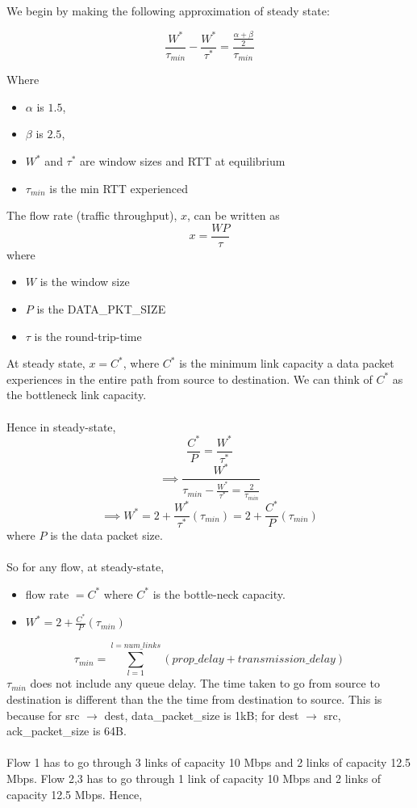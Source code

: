 \documentclass[12pt]{article}
\begin{document}
We begin by making the following approximation of steady state:

$$ \frac{W^*}{\tau_{min}} - \frac{W^*}{\tau^*} = \frac{\frac{\alpha + \beta}{2}}{\tau_{min}} $$

Where 
\begin{itemize}
\item $\alpha$ is $1.5$,
\item $\beta$ is $2.5$,
\item $W^*$ and $\tau^*$ are window sizes and RTT at equilibrium
\item $\tau_{min}$ is the min RTT experienced
\end{itemize}

The flow rate (traffic throughput), $x$, can be written as $$x=\frac{WP}{\tau}$$ where
\begin{itemize}
\item $W$ is the window size
\item $P$ is the DATA\_PKT\_SIZE
\item $\tau$ is the round-trip-time
\end{itemize}

At steady state, $x=C^*$, where $C^*$ is the minimum link capacity a data packet experiences in the entire path from source to destination. We can think of $C^*$ as the bottleneck link capacity.
\\\\
Hence in steady-state, $$\frac{C^*}{P} = \frac{W^*}{\tau^*} $$
$$\implies \frac{W^*}{\tau_{min} - \frac{W^*}{\tau^*} = \frac{2}{\tau_{min}}}$$
$$\implies W^* = 2 + \frac{W^*}{\tau^*}(\tau_{min}) = 2 + \frac{C^*}{P}(\tau_{min}) $$
where $P$ is the data packet size.
\\\\
So for any flow, at steady-state, 
\begin{itemize}
\item flow rate $= C^*$ where $C^*$ is the bottle-neck capacity.
\item $W^*=2 + \frac{C^*}{P}(\tau_{min})$
\end{itemize}


$$\tau_{min}=\sum_{l=1}^{l=num\_links} (prop\_delay + transmission\_delay)$$
$\tau_{min}$ does not include any queue delay. The time taken to go from source to destination is different than the the time from destination to source.  This is because for src $\rightarrow$ dest, data\_packet\_size is 1kB; for dest $\rightarrow$ src, ack\_packet\_size is 64B.
\\\\
Flow 1 has to go through 3 links of capacity 10 Mbps and 2 links of capacity 12.5 Mbps.
Flow 2,3 has to go through 1 link of capacity 10 Mbps and 2 links of capacity 12.5 Mbps.  Hence, 
\end{document}
